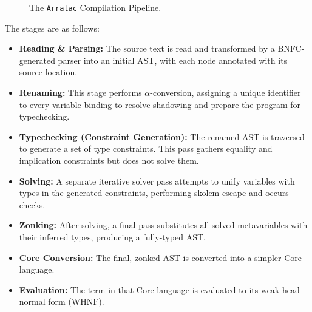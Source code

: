 \begin{figure}[h!]
    \centering
    \caption{The \texttt{Arralac} Compilation Pipeline.}
    \label{fig:pipeline}
\end{figure}

The stages are as follows:
\begin{itemize}
    \item \textbf{Reading \& Parsing:} The source text is read and transformed by a BNFC-generated parser \cite{bnfc-site-2025} into an initial AST, with each node annotated with its source location.
    \item \textbf{Renaming:} This stage performs $\alpha$-conversion, assigning a unique identifier to every variable binding to resolve shadowing and prepare the program for typechecking.
    \item \textbf{Typechecking (Constraint Generation):} The renamed AST is traversed to generate a set of type constraints. This pass gathers equality and implication constraints but does not solve them.
    \item \textbf{Solving:} A separate iterative solver pass attempts to unify variables with types in the generated constraints, performing skolem escape and occurs checks.
    \item \textbf{Zonking:} After solving, a final pass substitutes all solved metavariables with their inferred types, producing a fully-typed AST.
    \item \textbf{Core Conversion:} The final, zonked AST is converted into a simpler Core language.
    \item \textbf{Evaluation:} The term in that Core language is evaluated to its weak head normal form (WHNF).
\end{itemize}

